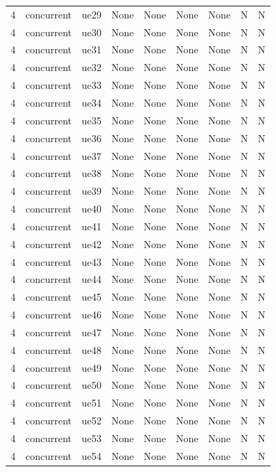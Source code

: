 \begin{table}[ht]
\begin{tabular}{|c|c|c|c|c|c|c|c|c|}
4 & concurrent & ue29 & None & None & None & None & N & N \\
4 & concurrent & ue30 & None & None & None & None & N & N \\
4 & concurrent & ue31 & None & None & None & None & N & N \\
4 & concurrent & ue32 & None & None & None & None & N & N \\
4 & concurrent & ue33 & None & None & None & None & N & N \\
4 & concurrent & ue34 & None & None & None & None & N & N \\
4 & concurrent & ue35 & None & None & None & None & N & N \\
4 & concurrent & ue36 & None & None & None & None & N & N \\
4 & concurrent & ue37 & None & None & None & None & N & N \\
4 & concurrent & ue38 & None & None & None & None & N & N \\
4 & concurrent & ue39 & None & None & None & None & N & N \\
4 & concurrent & ue40 & None & None & None & None & N & N \\
4 & concurrent & ue41 & None & None & None & None & N & N \\
4 & concurrent & ue42 & None & None & None & None & N & N \\
4 & concurrent & ue43 & None & None & None & None & N & N \\
4 & concurrent & ue44 & None & None & None & None & N & N \\
4 & concurrent & ue45 & None & None & None & None & N & N \\
4 & concurrent & ue46 & None & None & None & None & N & N \\
4 & concurrent & ue47 & None & None & None & None & N & N \\
4 & concurrent & ue48 & None & None & None & None & N & N \\
4 & concurrent & ue49 & None & None & None & None & N & N \\
4 & concurrent & ue50 & None & None & None & None & N & N \\
4 & concurrent & ue51 & None & None & None & None & N & N \\
4 & concurrent & ue52 & None & None & None & None & N & N \\
4 & concurrent & ue53 & None & None & None & None & N & N \\
4 & concurrent & ue54 & None & None & None & None & N & N \\

\end{tabular}
\end{table}
